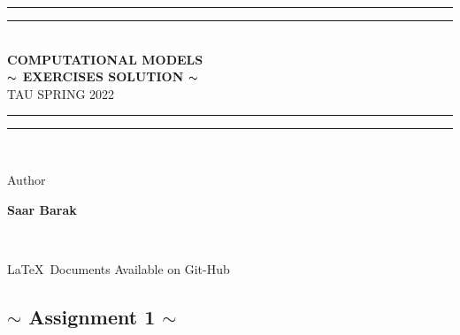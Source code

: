 \documentclass[12pt]{article}
\newlength{\drop}
\begin{document}
  \begin{titlepage}
    \textheight
    \centering
    \vspace*{\baselineskip}
    \rule{\textwidth}{3.6pt}\vspace*{-\baselineskip}\vspace*{6pt}
    \rule{\textwidth}{1.4pt}\\[\baselineskip]
    {\huge\textbf{COMPUTATIONAL MODELS \\ $\thicksim$ EXERCISES SOLUTION    $\thicksim$ }\\[0.3\baselineskip]{\Large TAU  SPRING 2022} }\\[0.4\baselineskip]
    \rule{\textwidth}{3.6pt}\vspace*{-\baselineskip}\vspace{6pt}
    \rule{\textwidth}{1.6pt}\\[\baselineskip]
    \scshape    
    
    \vspace*{4\baselineskip}
    Author \\[\baselineskip]
    {\Large \textbf{Saar Barak} \par}
    \vspace*{5\baselineskip}
    \vfill
   {\href{https://github.com/saarbk/Computational-Models}{{\huge{} }}}
   \\ \vspace*{1\baselineskip}
     {   \LaTeX \ Documents  Available on Git-Hub \par}
     \vspace*{1\baselineskip}
    \pagebreak
    \tableofcontents
    \par
  \end{titlepage}
  
  
\begin{center}
\section{$\sim$ Assignment 1 $\sim$}
\end{center}
\end{document}
